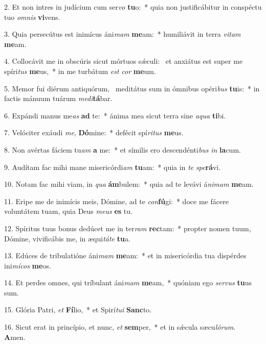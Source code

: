 2. Et non intres in judícium cum ser\textit{vo} \textbf{tu}o:~*  quia non justificábitur in conspéctu tuo \textit{om}\textit{nis} \textbf{vi}vens.\

3. Quia persecútus est inimícus áni\textit{mam} \textbf{me}am:~*  humiliávit in terra \textit{vi}\textit{tam} \textbf{me}am.\

4. Collocávit me in obscúris sicut mórtuos sǽculi: \dag\  et anxiátus est super me spíri\textit{tus} \textbf{me}us,~*  in me turbátum \textit{est} \textit{cor} \textbf{me}um.\

5. Memor fui diérum antiquórum, \dag\  meditátus sum in ómnibus opéri\textit{bus} \textbf{tu}is:~*  in factis mánuum tuárum \textit{me}\textit{di}\textbf{tá}bar.\

6. Expándi manus me\textit{as} \textbf{ad} te:~*  ánima mea sicut terra sine \textit{a}\textit{qua} \textbf{ti}bi.\

7. Velóciter exáudi \textit{me}, \textbf{Dó}mine:~*  defécit spí\textit{ri}\textit{tus} \textbf{me}us.\

8. Non avértas fáciem tu\textit{am} \textbf{a} me:~*  et símilis ero descendénti\textit{bus} \textit{in} \textbf{la}cum.\

9. Audítam fac mihi mane misericórdi\textit{am} \textbf{tu}am:~*  quia in \textit{te} \textit{spe}\textbf{rá}vi.\

10. Notam fac mihi viam, in \textit{qua} \textbf{ám}bulem:~*  quia ad te levávi á\textit{ni}\textit{mam} \textbf{me}am.\

11. Eripe me de inimícis meis, Dómine, ad te \textit{con}\textbf{fú}gi:~*  doce me fácere voluntátem tuam, quia Deus \textit{me}\textit{us} \textbf{es} tu.\

12. Spíritus tuus bonus dedúcet me in ter\textit{ram} \textbf{rec}tam:~*  propter nomen tuum, Dómine, vivificábis me, in æqui\textit{tá}\textit{te} \textbf{tu}a.\

13. Edúces de tribulatióne áni\textit{mam} \textbf{me}am:~*  et in misericórdia tua dispérdes ini\textit{mí}\textit{cos} \textbf{me}os.\

14. Et perdes omnes, qui tríbulant áni\textit{mam} \textbf{me}am,~*  quóniam ego \textit{ser}\textit{vus} \textbf{tu}us sum.\

15. Glória Patri, \textit{et} \textbf{Fí}lio,~*  et Spirí\textit{tu}\textit{i} \textbf{Sanc}to.\

16. Sicut erat in princípio, et nunc, \textit{et} \textbf{sem}per,~*  et in sǽcula sæcu\textit{ló}\textit{rum}. \textbf{A}men.\

